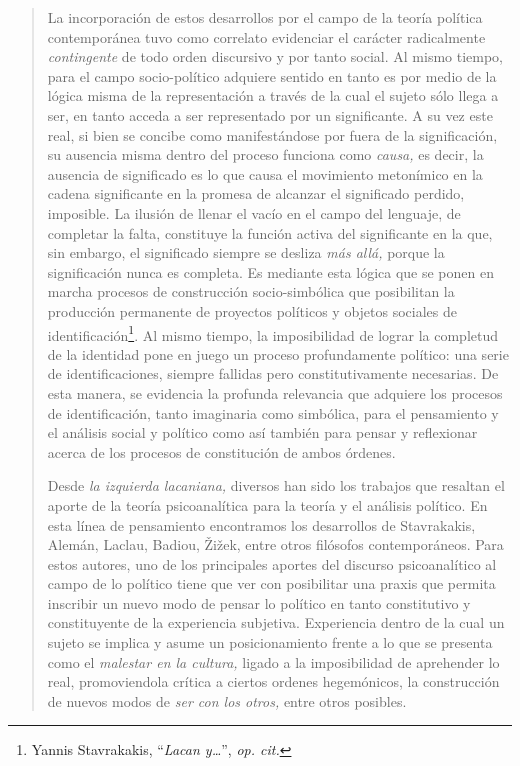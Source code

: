 \begin{quote}
La incorporación de estos desarrollos por el campo de la teoría política contemporánea tuvo como correlato evidenciar el carácter radicalmente \emph{contingente} de todo orden discursivo y por tanto social. Al mismo tiempo, para el campo socio-político adquiere sentido en tanto es por medio de la lógica misma de la representación a través de la cual el sujeto sólo llega a ser, en tanto acceda a ser representado por un significante. A su vez este real, si bien se concibe como manifestándose por fuera de la significación, su ausencia misma dentro del proceso funciona como \emph{causa,} es decir, la ausencia de significado es lo que causa el movimiento metonímico en la cadena significante en la promesa de alcanzar el significado perdido, imposible. La ilusión de llenar el vacío en el campo del lenguaje, de completar la falta, constituye la función activa del significante en la que, sin embargo, el significado siempre se desliza \emph{más allá,} porque la significación nunca es completa. Es mediante esta lógica que se ponen en marcha procesos de construcción socio-simbólica que posibilitan la producción permanente de proyectos políticos y objetos sociales de identificación\footnote{Yannis Stavrakakis, \enquote{\emph{Lacan y\ldots{}}}, \emph{op. cit.}}. Al mismo tiempo, la imposibilidad de lograr la completud de la identidad pone en juego un proceso profundamente político: una serie de identificaciones, siempre fallidas pero constitutivamente necesarias. De esta manera, se evidencia la profunda relevancia que adquiere los procesos de identificación, tanto imaginaria como simbólica, para el pensamiento y el análisis social y político como así también para pensar y reflexionar acerca de los procesos de constitución de ambos órdenes.

Desde \emph{la izquierda lacaniana,} diversos han sido los trabajos que resaltan el aporte de la teoría psicoanalítica para la teoría y el análisis político. En esta línea de pensamiento encontramos los desarrollos de Stavrakakis, Alemán, Laclau, Badiou, Žižek, entre otros filósofos contemporáneos. Para estos autores, uno de los principales aportes del discurso psicoanalítico al campo de lo político tiene que ver con posibilitar una praxis que permita inscribir un nuevo modo de pensar lo político en tanto constitutivo y constituyente de la experiencia subjetiva. Experiencia dentro de la cual un sujeto se implica y asume un posicionamiento frente a lo que se presenta como el \emph{malestar en la cultura,} ligado a la imposibilidad de aprehender lo real, promoviendola crítica a ciertos ordenes hegemónicos, la construcción de nuevos modos de \emph{ser con los otros,} entre otros posibles.


\end{quote}
